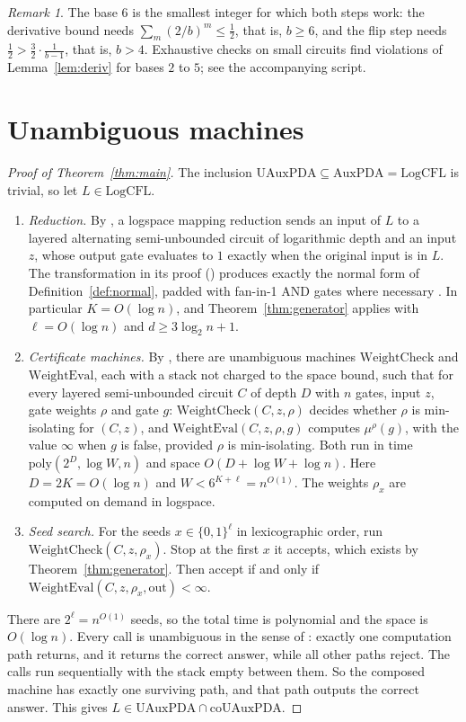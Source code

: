 \documentclass[11pt,letterpaper]{article}
\theoremstyle{definition}
\theoremstyle{remark}
\newtheorem{remark}[theorem]{Remark}
\newcommand{\LogCFL}{\mathrm{LogCFL}}
\newcommand{\UAux}{\mathrm{UAuxPDA}}
\begin{document}
\begin{remark}
The base $6$ is the smallest integer for which both steps work: the derivative bound needs
$\sum_m(2/b)^m\le\frac12$, that is, $b\ge6$, and the flip step needs
$\frac12>\frac32\cdot\frac1{b-1}$, that is, $b>4$. Exhaustive checks on small circuits
find violations of Lemma~\ref{lem:deriv} for bases $2$ to $5$; see the accompanying
script.
\end{remark}

\section{Unambiguous machines}\label{sec:machines}

\begin{proof}[Proof of Theorem~\ref{thm:main}]
The inclusion $\UAux\subseteq\mathrm{AuxPDA}=\LogCFL$ is trivial, so let $L\in\LogCFL$.
\begin{enumerate}
\item \emph{Reduction.} By \cite[Proposition~2]{vMP}, a logspace mapping reduction sends an
 input of $L$ to a layered alternating semi-unbounded circuit of logarithmic depth
 and an input $z$, whose output gate evaluates to $1$ exactly when the original
 input is in $L$. The transformation in its proof (\cite[Claim~6]{vMP}) produces
 exactly the normal form of Definition~\ref{def:normal}, padded with fan-in-1 AND
 gates where necessary \cite[footnotes~10 and~11]{vMP}. In particular $K=O(\log n)$,
 and Theorem~\ref{thm:generator} applies with $\ell=O(\log n)$ and $d\ge3\log_2n+1$.
\item \emph{Certificate machines.} By \cite[Lemma~3]{vMP}, there are unambiguous
 machines $\mathrm{WeightCheck}$ and $\mathrm{WeightEval}$, each with a stack not charged to
 the space bound, such that for every layered semi-unbounded circuit $C$ of depth
 $D$ with $n$ gates, input $z$, gate weights $\rho$ and gate $g$:
 $\mathrm{WeightCheck}(C,z,\rho)$ decides whether $\rho$ is min-isolating for
 $(C,z)$, and $\mathrm{WeightEval}(C,z,\rho,g)$ computes $\mu^\rho(g)$, with
 the value $\infty$ when $g$ is false, provided $\rho$ is min-isolating. Both run in time
 $\mathrm{poly}(2^D,\log W,n)$ and space $O(D+\log W+\log n)$. Here $D=2K=O(\log n)$ and
 $W<6^{K+\ell}=n^{O(1)}$. The weights $\rho_x$ are computed on demand in logspace.
\item \emph{Seed search.} For the seeds $x\in\{0,1\}^\ell$ in lexicographic order, run
 $\mathrm{WeightCheck}(C,z,\rho_x)$. Stop at the first $x$ it accepts, which exists by
 Theorem~\ref{thm:generator}. Then accept if and only if
 $\mathrm{WeightEval}(C,z,\rho_x,\mathrm{out})<\infty$.
\end{enumerate}
There are $2^\ell=n^{O(1)}$ seeds, so the total time is polynomial and the space is
$O(\log n)$. Every call is unambiguous in the sense of \cite{vMP,RA}: exactly one
computation path returns, and it returns the correct answer, while all other paths reject.
The calls run sequentially with the stack empty between them. So the
composed machine has exactly one surviving path, and that path outputs the
correct answer. This gives $L\in\UAux\cap\mathrm{co}\UAux$.
\end{proof}
\end{document}
